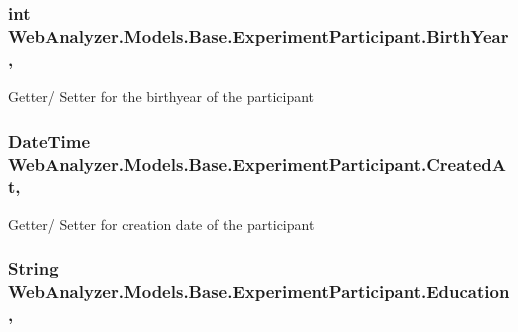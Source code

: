 \subsubsection[{Birth\+Year}]{\setlength{\rightskip}{0pt plus 5cm}int Web\+Analyzer.\+Models.\+Base.\+Experiment\+Participant.\+Birth\+Year\hspace{0.3cm}{\ttfamily [get]}, {\ttfamily [set]}}\label{class_web_analyzer_1_1_models_1_1_base_1_1_experiment_participant_a0f2caf65917325b6ff1422a0e12408a1}


Getter/ Setter for the birthyear of the participant 

\hypertarget{class_web_analyzer_1_1_models_1_1_base_1_1_experiment_participant_a9149e7b45b96c79f529042c1b208d086}{}
\subsubsection[{Created\+At}]{\setlength{\rightskip}{0pt plus 5cm}Date\+Time Web\+Analyzer.\+Models.\+Base.\+Experiment\+Participant.\+Created\+At\hspace{0.3cm}{\ttfamily [get]}, {\ttfamily [set]}}\label{class_web_analyzer_1_1_models_1_1_base_1_1_experiment_participant_a9149e7b45b96c79f529042c1b208d086}


Getter/ Setter for creation date of the participant 

\hypertarget{class_web_analyzer_1_1_models_1_1_base_1_1_experiment_participant_aeed3afa47a4a966a0d5c3277348c2846}{}
\subsubsection[{Education}]{\setlength{\rightskip}{0pt plus 5cm}String Web\+Analyzer.\+Models.\+Base.\+Experiment\+Participant.\+Education\hspace{0.3cm}{\ttfamily [get]}, {\ttfamily [set]}}\label{class_web_analyzer_1_1_models_1_1_base_1_1_experiment_participant_aeed3afa47a4a966a0d5c3277348c2846}


